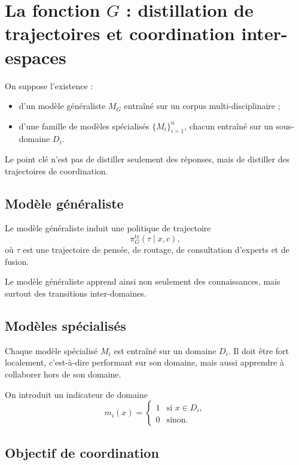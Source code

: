 \documentclass[11pt,a4paper]{article}
\newcommand{\1}{\mathbf 1}
\begin{document}
\section{La fonction \(G\) : distillation de trajectoires et coordination inter-espaces}

On suppose l'existence :

\begin{itemize}[leftmargin=2em]
    \item d'un modèle généraliste \(M_G\) entraîné sur un corpus multi-disciplinaire ;
    \item d'une famille de modèles spécialisés \(\{M_i\}_{i=1}^n\), chacun entraîné sur un sous-domaine \(D_i\).
\end{itemize}

Le point clé n'est pas de distiller seulement des réponses, mais de distiller des trajectoires de coordination.

\subsection{Modèle généraliste}

Le modèle généraliste induit une politique de trajectoire
\[
\pi_G^{\mathrm{tr}}(\tau\mid x,c),
\]
où \(\tau\) est une trajectoire de pensée, de routage, de consultation d'experts et de fusion.

Le modèle généraliste apprend ainsi non seulement des connaissances, mais surtout des transitions inter-domaines.

\subsection{Modèles spécialisés}

Chaque modèle spécialisé \(M_i\) est entraîné sur un domaine \(D_i\).
Il doit être fort localement, c'est-à-dire performant sur son domaine, mais aussi apprendre à collaborer hors de son domaine.

On introduit un indicateur de domaine
\[
m_i(x)=
\begin{cases}
1 & \text{si } x\in D_i,\\
0 & \text{sinon.}
\end{cases}
\]

\subsection{Objectif de coordination}
\end{document}
